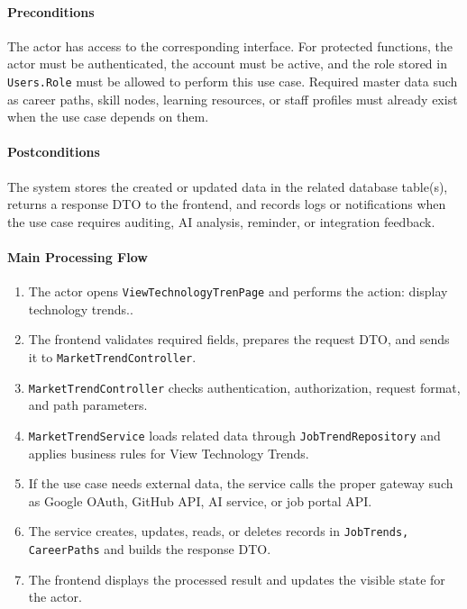 \paragraph{Preconditions}

The actor has access to the corresponding interface. For protected functions, the actor must be authenticated, the account must be active, and the role stored in \texttt{Users.Role} must be allowed to perform this use case. Required master data such as career paths, skill nodes, learning resources, or staff profiles must already exist when the use case depends on them.

\paragraph{Postconditions}

The system stores the created or updated data in the related database table(s), returns a response DTO to the frontend, and records logs or notifications when the use case requires auditing, AI analysis, reminder, or integration feedback.

\paragraph{Main Processing Flow}

\begin{enumerate}
    \item The actor opens \texttt{ViewTechnologyTrenPage} and performs the action: display technology trends..
    \item The frontend validates required fields, prepares the request DTO, and sends it to \texttt{MarketTrendController}.
    \item \texttt{MarketTrendController} checks authentication, authorization, request format, and path parameters.
    \item \texttt{MarketTrendService} loads related data through \texttt{JobTrendRepository} and applies business rules for View Technology Trends.
    \item If the use case needs external data, the service calls the proper gateway such as Google OAuth, GitHub API, AI service, or job portal API.
    \item The service creates, updates, reads, or deletes records in \texttt{JobTrends, CareerPaths} and builds the response DTO.
    \item The frontend displays the processed result and updates the visible state for the actor.
\end{enumerate}

